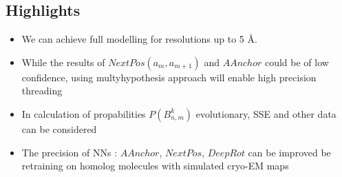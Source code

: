 \documentclass{article}
\begin{document}
\subsection{Highlights}
\begin{itemize}
	\item We can achieve full modelling for resolutions up to 5 \AA.
	\item While the results of $NextPos(a_m,a_{m+1})$ and $AAnchor$ could be of low confidence, using multyhypothesis approach will enable high precision threading
	\item In calculation of propabilities $P(B_{n,m}^k)$ evolutionary, SSE and other data can be considered
	\item The precision of NNs : $AAnchor$, $NextPos$, $DeepRot$ can be improved be retraining on homolog molecules with simulated cryo-EM maps
	
\end{itemize}
\end{document}
